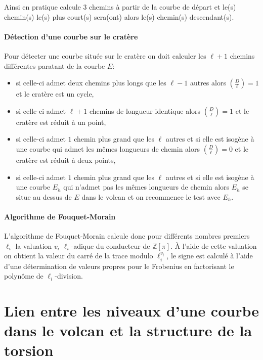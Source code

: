 \documentclass[10pt,a4paper]{book}
\theoremstyle{plain}
\theoremstyle{definition}
\theoremstyle{definition}
\theoremstyle{definition}
\theoremstyle{definition}
\theoremstyle{remark}
\theoremstyle{remark}
\begin{document}
Ainsi en pratique \cite{FouquetMorain02} calcule 3 chemins à partir de la courbe de départ et le(s) chemin(s) le(s) plus court(s) sera(ont) alors le(s) chemin(s) descendant(s). 

\paragraph{Détection d'une courbe sur le cratère}
Pour détecter une courbe située sur le cratère on doit calculer les $\ell+1$ chemins différentes paratant de la courbe $E$:
\begin{itemize}
\item si celle-ci admet deux chemins plus longs que les $\ell-1$ autres alors $\left( \frac{D}{\ell} \right) = 1$ et le cratère est un cycle,
\item si celle-ci admet $\ell+1$ chemins de longueur identique alors $\left( \frac{D}{\ell} \right) = 1$ et le cratère est réduit à un point,
\item si celle-ci admet $1$ chemin plus grand que les $\ell$ autres et si elle est isogène à une courbe qui admet les mêmes longueurs de chemin alors $\left( \frac{D}{\ell} \right) = 0$ et le cratère est réduit à deux points,
\item si celle-ci admet $1$ chemin plus grand que les $\ell$ autres et si elle est isogène à une courbe $E_h$ qui n'admet pas les mêmes longueurs de chemin alors $E_h$ se situe au dessus de $E$ dans le volcan et on recommence le test avec $E_h$.
\end{itemize}

\paragraph{Algorithme de Fouquet-Morain}
L'algorithme de Fouquet-Morain \cite{FouquetMorain02} calcule donc pour différents nombres premiers $\ell_i$ la valuation $v_i$ $\ell_i$-adique du conducteur de $\mathbb{Z}[\pi]$. \`A l'aide de cette valuation on obtient la valeur du carré de la trace modulo $\ell_i^{v_i}$, le signe est calculé à l'aide d'une détermination de valeurs propres pour le Frobenius en factorisant le polynôme de $\ell_i$-division. 



\section{Lien entre les niveaux d'une courbe dans le volcan et la structure de la torsion}
\end{document}
